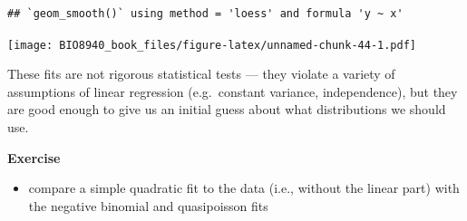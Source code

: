 \documentclass[
  12pt,
]{book}
\providecommand{\tightlist}{%
  \setlength{\itemsep}{0pt}\setlength{\parskip}{0pt}}
\begin{document}
\begin{verbatim}
## `geom_smooth()` using method = 'loess' and formula 'y ~ x'
\end{verbatim}

\texttt{[image: BIO8940\_book\_files/figure-latex/unnamed-chunk-44-1.pdf]}

These fits are not rigorous statistical tests --- they violate a variety of assumptions of linear regression (e.g.~constant variance, independence), but they are good enough to give us an initial guess about what distributions we should use.

\textbf{Exercise}

\begin{itemize}
\tightlist
\item
  compare a simple quadratic fit to the data (i.e., without the linear part) with the negative binomial and quasipoisson fits
\end{itemize}
\end{document}
